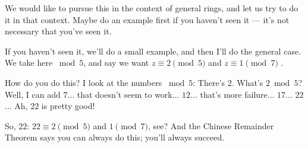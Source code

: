 \begin{speech}[01:09:07 - 01:10:32]
We would like to pursue this in the context of general rings, and let us try to do it in that context. Maybe do an example first if you haven't seen it --- it's not necessary that you've seen it.

If you haven't seen it, we'll do a small example, and then I'll do the general case. We take here $\bmod 5$, and say we want $z \equiv 2 \pmod 5$ and $z \equiv 1 \pmod 7$ .

How do you do this? I look at the numbers $\bmod 5$: There's $2$. What's $2 \bmod 5$? Well, I can add $7$... that doesn't seem to work... $12$... that's more failure... $17$... $22$... Ah, $22$ is pretty good! 

So, $22$: $22 \equiv 2 \pmod 5$ and $1 \pmod 7$, see? And the Chinese Remainder Theorem says you can always do this; you'll always succeed.
\end{speech}

\begin{content}
\end{content}

